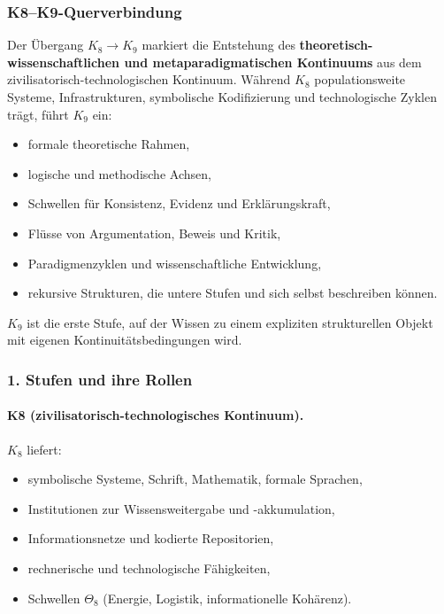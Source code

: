 
\subsubsection{K8–K9-Querverbindung}
\label{sec:crossk-k8-k9}

Der Übergang $K_8 \rightarrow K_9$ markiert die Entstehung des
\textbf{theoretisch-wissenschaftlichen und metaparadigmatischen Kontinuums}
aus dem zivilisatorisch-technologischen Kontinuum. Während $K_8$ populationsweite
Systeme, Infrastrukturen, symbolische Kodifizierung und technologische Zyklen
trägt, führt $K_9$ ein:
\begin{itemize}
  \item formale theoretische Rahmen,
  \item logische und methodische Achsen,
  \item Schwellen für Konsistenz, Evidenz und Erklärungskraft,
  \item Flüsse von Argumentation, Beweis und Kritik,
  \item Paradigmenzyklen und wissenschaftliche Entwicklung,
  \item rekursive Strukturen, die untere Stufen und sich selbst beschreiben können.
\end{itemize}

$K_9$ ist die erste Stufe, auf der Wissen zu einem expliziten strukturellen
Objekt mit eigenen Kontinuitätsbedingungen wird.

\subsubsection{1. Stufen und ihre Rollen}

\paragraph{K8 (zivilisatorisch-technologisches Kontinuum).}
$K_8$ liefert:
\begin{itemize}
  \item symbolische Systeme, Schrift, Mathematik, formale Sprachen,
  \item Institutionen zur Wissensweitergabe und -akkumulation,
  \item Informationsnetze und kodierte Repositorien,
  \item rechnerische und technologische Fähigkeiten,
  \item Schwellen $\Theta_8$ (Energie, Logistik, informationelle Kohärenz).
\end{itemize}

